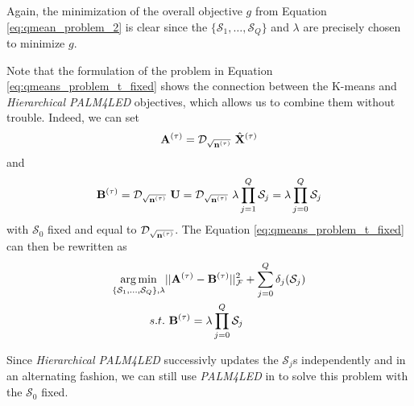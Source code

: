 Again,  the minimization of the overall objective $g$ from Equation \ref{eq:qmean_problem_2} is clear since the $\{ \mathcal{S}_1, \ldots,\mathcal{S}_Q\}$ and $\lambda$ are precisely chosen to minimize $g$.

Note that the formulation of the problem in Equation \ref{eq:qmeans_problem_t_fixed} shows the connection between the K-means and \textit{Hierarchical PALM4LED} objectives, which allows us to combine them without trouble. Indeed, we can set
%
\begin{equation*}
{\mathbf{A}}^{(\tau)} = \mathcal{D}_{\sqrt{{\mathbf{n}}^{(\tau)}}}~\hat{{\mathbf{X}}}^{(\tau)}
\end{equation*}
and
\begin{equation*}
{\mathbf{B}}^{(\tau)} = \mathcal{D}_{\sqrt{{\mathbf{n}}^{(\tau)}}}~{\mathbf{U}} = \mathcal{D}_{\sqrt{{\mathbf{n}}^{(\tau)}}}~\lambda \prod_{j=1}^{Q}{\mathcal{S}_j} = \lambda \prod_{j=0}^{Q}{\mathcal{S}_j}
\end{equation*}
%
with $\mathcal{S}_0$ fixed and equal to $\mathcal{D}_{\sqrt{{\mathbf{n}}^{(\tau)}}}$. The Equation \ref{eq:qmeans_problem_t_fixed} can then be rewritten as
%
\begin{equation}
\begin{split}
 \operatorname*{arg\,min}_{\{ \mathcal{S}_1, \ldots,\mathcal{S}_Q\}, \lambda} & ||{\mathbf{A}}^{(\tau)} - {\mathbf{B}}^{(\tau)}||_{\mathcal{F}} ^ 2  +  \sum_{j=0}^{Q} \delta_j(\mathcal{S}_j)\\
 s.t. &~ {\mathbf{B}}^{(\tau)} = \lambda \prod_{j=0}^{Q}{\mathcal{S}_j}
\end{split}
\end{equation}

Since \textit{Hierarchical PALM4LED} successivly updates the $\mathcal{S}_j$s independently and in an alternating fashion, we can still use \textit{PALM4LED} in to solve this problem with the $\mathcal{S}_0$ fixed.


